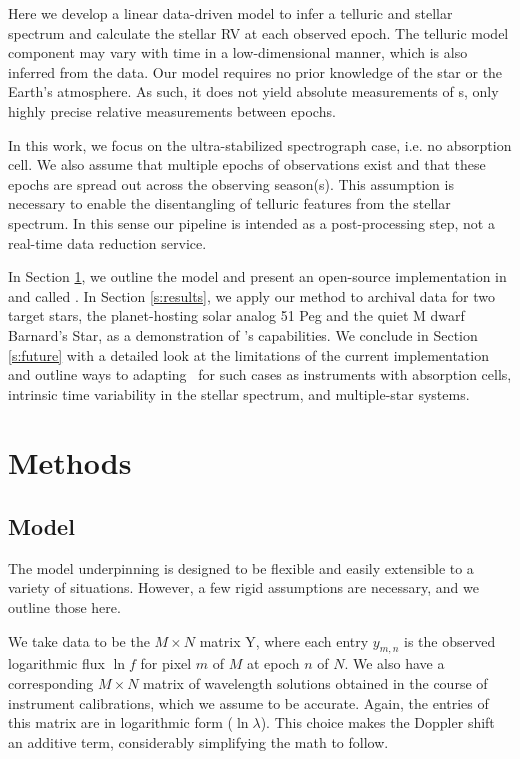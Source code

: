 \documentclass[modern]{aastex62}
\newcommand{\Mdwarf}{Barnard's Star}
\begin{document}
Here we develop a linear data-driven model to infer a telluric and stellar spectrum and calculate the stellar RV at each observed epoch. 
The telluric model component may vary with time in a low-dimensional manner, which is also inferred from the data. 
Our model requires no prior knowledge of the star or the Earth's atmosphere. 
As such, it does not yield absolute measurements of \RV s, only highly precise relative measurements between epochs.

In this work, we focus on the ultra-stabilized spectrograph case, i.e. no absorption cell. 
We also assume that multiple epochs of observations exist and that these epochs are spread out across the observing season(s). 
This assumption is necessary to enable the disentangling of telluric features from the stellar spectrum. 
In this sense our pipeline is intended as a post-processing step, not a real-time data reduction service. 

In Section \ref{s:methods}, we outline the model and present an open-source implementation in \python and \TF called \wobble. 
In Section \ref{s:results}, we apply our method to \HARPS archival data for two target stars, the planet-hosting solar analog 51 Peg and the quiet M dwarf \Mdwarf, as a demonstration of \wobble's capabilities. 
We conclude in Section \ref{s:future} with a detailed look at the limitations of the current implementation and outline ways to adapting \wobble\ for such cases as instruments with absorption cells, intrinsic time variability in the stellar spectrum, and multiple-star systems.

\section{Methods}
\label{s:methods}
\subsection{Model}

The model underpinning \wobble is designed to be flexible and easily extensible to a variety of situations. 
However, a few rigid assumptions are necessary, and we outline those here.

We take data to be the $M \times N$ matrix Y, where each entry $y_{m,n}$ is the observed logarithmic flux $\ln f$ for pixel $m$ of $M$ at epoch $n$ of $N$. 
We also have a corresponding $M \times N$ matrix of wavelength solutions obtained in the course of instrument calibrations, which we assume to be accurate.
Again, the entries of this matrix are in logarithmic form ($\ln \lambda$). 
This choice makes the Doppler shift an additive term, considerably simplifying the math to follow.
\end{document}
